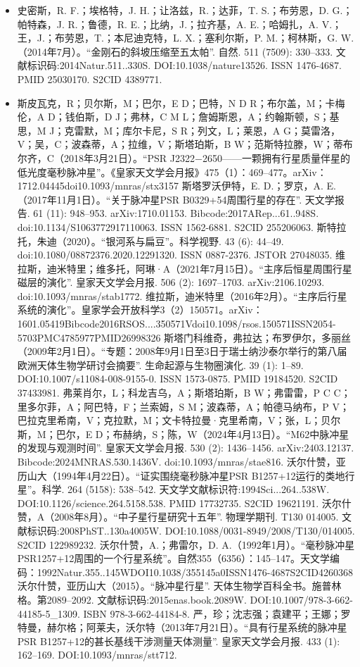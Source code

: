 \begin{itemize}
\item 史密斯，R. F.；埃格特，J. H.；让洛兹，R.；达菲，T. S.；布劳恩，D. G.；帕特森，J. R.；鲁德，R. E.；比纳，J.；拉齐基，A. E.；哈姆扎，A. V.；王，J.；布劳恩，T.；本尼迪克特，L. X.；塞利尔斯，P. M.；柯林斯，G. W.（2014年7月）。“金刚石的斜坡压缩至五太帕”. 自然. 511 (7509): 330–333. 文献标识码:2014Natur.511..330S. DOI:10.1038/nature13526. ISSN 1476-4687. PMID 25030170. S2CID 4389771.
\item 斯皮瓦克，R；贝尔斯，M；巴尔，E D；巴特，N D R；布尔盖，M；卡梅伦，A D；钱伯斯，D J；弗林，C M L；詹姆斯恩，A；约翰斯顿，S；基思，M J；克雷默，M；库尔卡尼，S R；列文，L；莱恩，A G；莫雷洛，V；吴，C；波森蒂，A；拉维，V；斯塔珀斯，B W；范斯特拉滕，W；蒂布尔齐，C（2018年3月21日）。“PSR J2322−2650——一颗拥有行星质量伴星的低光度毫秒脉冲星”。《皇家天文学会月报》475（1）：469–477。arXiv：1712.04445doi10.1093/mnras/stx3157
斯塔罗沃伊特，E. D.；罗京，A. E.（2017年11月1日）。“关于脉冲星PSR B0329+54周围行星的存在”. 天文学报告. 61 (11): 948–953. arXiv:1710.01153. Bibcode:2017ARep...61..948S. doi:10.1134/S1063772917110063. ISSN 1562-6881. S2CID 255206063.
斯特拉托，朱迪（2020）。“银河系与扁豆”。科学视野. 43 (6): 44–49. doi:10.1080/08872376.2020.12291320. ISSN 0887-2376. JSTOR 27048035.
维拉斯，迪米特里；维多托，阿琳·A（2021年7月15日）。“主序后恒星周围行星磁层的演化”. 皇家天文学会月报. 506 (2): 1697–1703. arXiv:2106.10293. doi:10.1093/mnras/stab1772.
维拉斯，迪米特里（2016年2月）。“主序后行星系统的演化”。皇家学会开放科学3（2）150571。arXiv：1601.05419Bibcode2016RSOS....350571Vdoi10.1098/rsos.150571ISSN2054-5703PMC4785977PMID26998326
斯塔门科维奇，弗拉达；布罗伊尔，多丽丝（2009年2月1日）。“专题：2008年9月1日至3日于瑞士纳沙泰尔举行的第八届欧洲天体生物学研讨会摘要”. 生命起源与生物圈演化. 39 (1): 1–89. DOI:10.1007/s11084-008-9155-0. ISSN 1573-0875. PMID 19184520. S2CID 37433981.
弗莱肖尔，L；科龙吉乌，A；斯塔珀斯，B W；弗雷雷，P C C；里多尔菲，A；阿巴特，F；兰索姆，S M；波森蒂，A；帕德马纳布，P V；巴拉克里希南，V；克拉默，M；文卡特拉曼·克里希南，V；张，L；贝尔斯，M；巴尔，E D；布赫纳，S；陈，W（2024年4月13日）。“M62中脉冲星的发现与观测时间”. 皇家天文学会月报. 530 (2): 1436–1456. arXiv:2403.12137. Bibcode:2024MNRAS.530.1436V. doi:10.1093/mnras/stae816.
沃尔什赞，亚历山大（1994年4月22日）。“证实围绕毫秒脉冲星PSR B1257+12运行的类地行星”。科学. 264 (5158): 538–542. 天文学文献标识符:1994Sci...264..538W. DOI:10.1126/science.264.5158.538. PMID 17732735. S2CID 19621191.
沃尔什赞，A（2008年8月）。“中子星行星研究十五年”. 物理学期刊. T130 014005. 文献标识码:2008PhST..130a4005W. DOI:10.1088/0031-8949/2008/T130/014005. S2CID 122989232.
沃尔什赞，A.；弗雷尔，D. A.（1992年1月）。“毫秒脉冲星PSR1257+12周围的一个行星系统”。自然355（6356）：145–147。天文学编码：1992Natur.355..145WDOI10.1038/355145a0ISSN1476-4687S2CID4260368
沃尔什赞，亚历山大（2015）。“脉冲星行星”. 天体生物学百科全书。施普林格。第2089–2092. 文献标识码:2015enas.book.2089W. DOI:10.1007/978-3-662-44185-5_1309. ISBN 978-3-662-44184-8.
严，珍；沈志强；袁建平；王娜；罗特曼，赫尔格；阿莱夫，沃尔特（2013年7月21日）。“具有行星系统的脉冲星PSR B1257+12的甚长基线干涉测量天体测量”. 皇家天文学会月报. 433 (1): 162–169. DOI:10.1093/mnras/stt712.
\end{itemize}